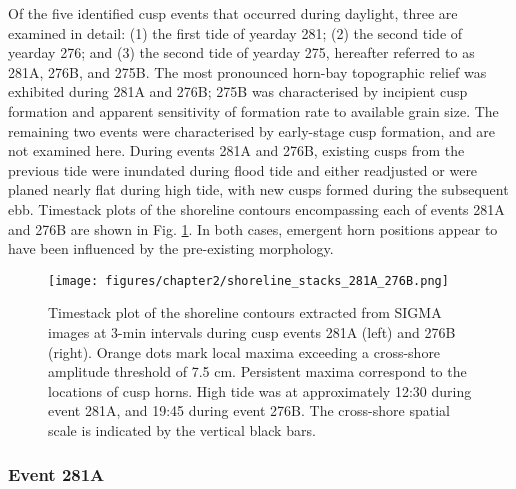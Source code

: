 Of the five identified cusp events that occurred during daylight, three are examined in detail: (1) the first tide of yearday 281; (2) the second tide of yearday 276; and (3) the second tide of yearday 275, hereafter referred to as 281A, 276B, and 275B. The most pronounced horn-bay topographic relief was exhibited during 281A and 276B; 275B was characterised by incipient cusp formation and apparent sensitivity of formation rate to available grain size. The remaining two events were characterised by early-stage cusp formation, and are not examined here. During events 281A and 276B, existing cusps from the previous tide were inundated during flood tide and either readjusted or were planed nearly flat during high tide, with new cusps formed during the subsequent ebb. Timestack plots of the shoreline contours encompassing each of events 281A and 276B are shown in Fig. \ref{fig:shoreline_stacks_276B_281A}. In both cases, emergent horn positions appear to have been influenced by the pre-existing morphology.

\begin{figure}[tbp] %
 	\texttt{[image: figures/chapter2/shoreline\_stacks\_281A\_276B.png]}
	\caption[Timestacked shoreline contours]{Timestack plot of the shoreline contours extracted from SIGMA images at 3-min intervals during cusp events 281A (left) and 276B (right). Orange dots mark local maxima exceeding a cross-shore amplitude threshold of 7.5 cm. Persistent maxima correspond to the locations of cusp horns. High tide was at approximately 12:30 during event 281A, and 19:45 during event 276B. The cross-shore spatial scale is indicated by the vertical black bars.}
	\label{fig:shoreline_stacks_276B_281A}
\end{figure}


\subsubsection{Event 281A}\label{281A}

